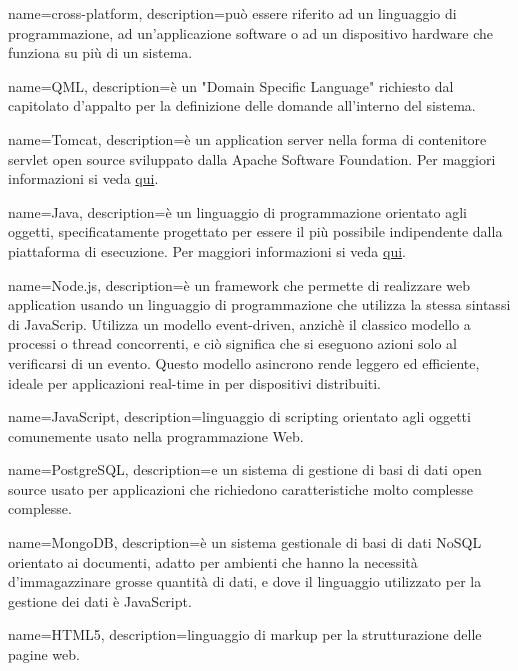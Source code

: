  {
	name=cross-platform,
	description={può essere riferito ad un linguaggio di programmazione, ad un'applicazione software o ad un dispositivo hardware che funziona su più di un sistema.}
}

 {
	name=QML,
	description={è un "Domain Specific Language" richiesto dal capitolato d'appalto per la definizione delle domande all'interno del sistema.}
}

 {
	name=Tomcat,
	description={è un application server nella forma di contenitore servlet open source sviluppato dalla Apache Software Foundation. Per maggiori informazioni si veda \href{https://it.wikipedia.org/wiki/Apache_Tomcat}{qui}.}
}

 {
	name=Java,
	description={è un linguaggio di programmazione orientato agli oggetti, specificatamente progettato per essere il più possibile indipendente dalla piattaforma di esecuzione. Per maggiori informazioni si veda \href{https://it.wikipedia.org/wiki/Java_(linguaggio_di_programmazione)}{qui}.}
}

 {
	name=Node.js,
	description={è un framework che permette di realizzare web application usando un linguaggio di programmazione che utilizza la stessa sintassi di JavaScrip. Utilizza un modello event-driven, anzichè il classico modello a processi o thread concorrenti, e ciò significa che si eseguono azioni solo al verificarsi di un evento. Questo modello asincrono rende leggero ed efficiente, ideale per applicazioni real-time in per dispositivi distribuiti.}
}

 {
	name=JavaScript,
	description={linguaggio di scripting orientato agli oggetti comunemente usato nella programmazione
Web.}
}

 {
	name=PostgreSQL,
	description={e un sistema di gestione di basi di dati open source usato per applicazioni che richiedono caratteristiche molto complesse complesse.}
}

 {
	name=MongoDB,
	description={è un sistema gestionale di basi di dati NoSQL orientato ai documenti, adatto per ambienti che hanno la necessità d'immagazzinare grosse quantità di dati, e dove il linguaggio utilizzato per la gestione dei dati è JavaScript.}
}

 {
	name=HTML5,
	description={linguaggio di markup per la strutturazione delle pagine web.}
}

